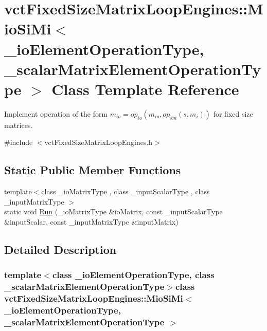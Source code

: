 \hypertarget{classvct_fixed_size_matrix_loop_engines_1_1_mio_si_mi}{}\section{vct\+Fixed\+Size\+Matrix\+Loop\+Engines\+:\+:Mio\+Si\+Mi$<$ \+\_\+io\+Element\+Operation\+Type, \+\_\+scalar\+Matrix\+Element\+Operation\+Type $>$ Class Template Reference}
\label{classvct_fixed_size_matrix_loop_engines_1_1_mio_si_mi}


Implement operation of the form $m_{io} = op_{io}(m_{io}, op_{sm}(s, m_i))$ for fixed size matrices.  




{\ttfamily \#include $<$vct\+Fixed\+Size\+Matrix\+Loop\+Engines.\+h$>$}

\subsection*{Static Public Member Functions}
\begin{DoxyCompactItemize}
\item 
{\footnotesize template$<$class \+\_\+io\+Matrix\+Type , class \+\_\+input\+Scalar\+Type , class \+\_\+input\+Matrix\+Type $>$ }\\static void \hyperlink{classvct_fixed_size_matrix_loop_engines_1_1_mio_si_mi_af0ffd7f21d1e5b73ff12d8759e1c1c4f}{Run} (\+\_\+io\+Matrix\+Type \&io\+Matrix, const \+\_\+input\+Scalar\+Type \&input\+Scalar, const \+\_\+input\+Matrix\+Type \&input\+Matrix)
\end{DoxyCompactItemize}


\subsection{Detailed Description}
\subsubsection*{template$<$class \+\_\+io\+Element\+Operation\+Type, class \+\_\+scalar\+Matrix\+Element\+Operation\+Type$>$class vct\+Fixed\+Size\+Matrix\+Loop\+Engines\+::\+Mio\+Si\+Mi$<$ \+\_\+io\+Element\+Operation\+Type, \+\_\+scalar\+Matrix\+Element\+Operation\+Type $>$}

